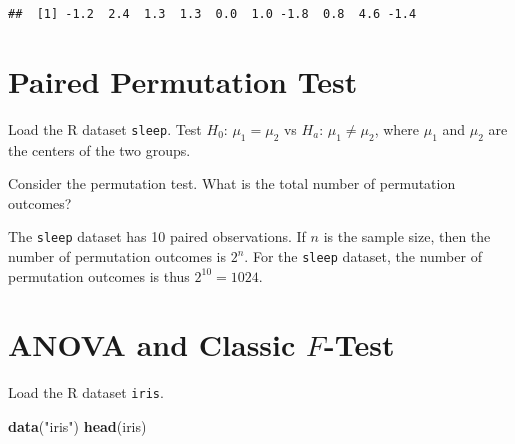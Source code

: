 \documentclass[
]{book}
\newenvironment{Shaded}{\begin{snugshade}}{\end{snugshade}}
\newcommand{\DataTypeTok}[1]{\textcolor[rgb]{0.13,0.29,0.53}{#1}}
\newcommand{\DecValTok}[1]{\textcolor[rgb]{0.00,0.00,0.81}{#1}}
\newcommand{\KeywordTok}[1]{\textcolor[rgb]{0.13,0.29,0.53}{\textbf{#1}}}
\newcommand{\NormalTok}[1]{#1}
\newcommand{\OperatorTok}[1]{\textcolor[rgb]{0.81,0.36,0.00}{\textbf{#1}}}
\newcommand{\OtherTok}[1]{\textcolor[rgb]{0.56,0.35,0.01}{#1}}
\newcommand{\StringTok}[1]{\textcolor[rgb]{0.31,0.60,0.02}{#1}}
\begin{document}
\begin{Shaded}
\end{Shaded}

\begin{verbatim}
##  [1] -1.2  2.4  1.3  1.3  0.0  1.0 -1.8  0.8  4.6 -1.4
\end{verbatim}

\hypertarget{paired-permutation-test}{%
\section{Paired Permutation Test}\label{paired-permutation-test}}

Load the R dataset \texttt{sleep}.
Test \(H_0\): \(\mu_1 = \mu_2\) vs \(H_a\): \(\mu_1 \neq \mu_2\),
where \(\mu_1\) and \(\mu_2\) are the centers of the two groups.

Consider the permutation test. What is the total number of permutation outcomes?

The \texttt{sleep} dataset has 10 paired observations.
If \(n\) is the sample size, then the number of permutation outcomes is \(2^n\).
For the \texttt{sleep} dataset,
the number of permutation outcomes is thus \(2^{10} = 1024\).

\hypertarget{anova-and-classic-f-test}{%
\section{\texorpdfstring{ANOVA and Classic \(F\)-Test}{ANOVA and Classic F-Test}}\label{anova-and-classic-f-test}}

Load the R dataset \texttt{iris}.

\begin{Shaded}
\begin{Highlighting}[]
\KeywordTok{data}\NormalTok{(}\StringTok{"iris"}\NormalTok{)}
\KeywordTok{head}\NormalTok{(iris)}
\end{Highlighting}
\end{Shaded}
\end{document}
